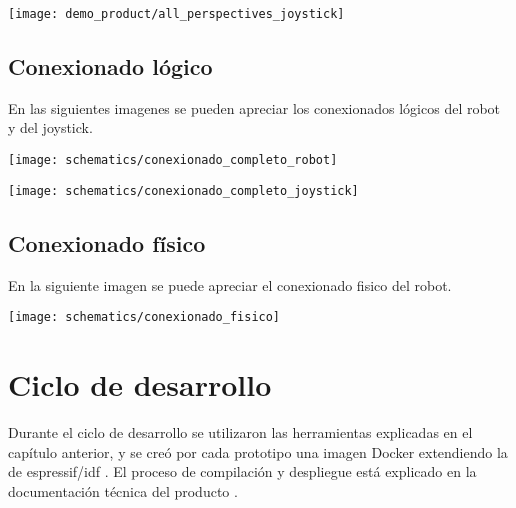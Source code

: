 \begin{center}
\texttt{[image: demo\_product/all\_perspectives\_joystick]}
  \label{fig:conexionado_fisico}
\end{center}



\subsection{Conexionado lógico }

En las siguientes imagenes se pueden apreciar los conexionados lógicos del robot y del joystick.

\begin{center}
\texttt{[image: schematics/conexionado\_completo\_robot]}
  \label{fig:conexionado_completo_robot}
\end{center}


\begin{center}
\texttt{[image: schematics/conexionado\_completo\_joystick]}
  \label{fig:conexionado_completo_joystick}
\end{center}


\subsection{Conexionado físico}

En la siguiente imagen se puede apreciar el conexionado fisico del robot.

\begin{center}
\texttt{[image: schematics/conexionado\_fisico]}
  \label{fig:conexionado_fisico}
\end{center}




\section{Ciclo de desarrollo}

Durante el ciclo de desarrollo se utilizaron las herramientas explicadas en el capítulo anterior, y se creó por cada prototipo una imagen Docker extendiendo la de espressif/idf \cite{Espressif_docker_image}. El proceso de compilación y despliegue está explicado en la documentación técnica del producto \cite{Robot_Tecnical_doc}.










